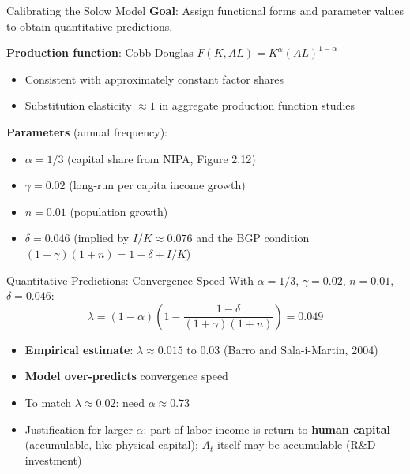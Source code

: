 \documentclass[blue]{beamer}
\begin{document}
\begin{frame}{Calibrating the Solow Model}
	\textbf{Goal}: Assign functional forms and parameter values to obtain quantitative predictions.
	
	\bigskip
	\textbf{Production function}: Cobb-Douglas $F(K,AL) = K^\alpha(AL)^{1-\alpha}$
	\begin{itemize}
		\item Consistent with approximately constant factor shares
		\item Substitution elasticity $\approx 1$ in aggregate production function studies
	\end{itemize}
	
	\bigskip
	\textbf{Parameters} (annual frequency):
	\begin{itemize}
		\item $\alpha = 1/3$ (capital share from NIPA, Figure 2.12)
		\item $\gamma = 0.02$ (long-run per capita income growth)
		\item $n = 0.01$ (population growth)
		\item $\delta = 0.046$ (implied by $I/K \approx 0.076$ and the BGP condition $(1+\gamma)(1+n) = 1 - \delta + I/K$)
	\end{itemize}
\end{frame}

\begin{frame}{Quantitative Predictions: Convergence Speed}
	With $\alpha = 1/3$, $\gamma = 0.02$, $n = 0.01$, $\delta = 0.046$:
	\[
	\lambda = (1-\alpha)\left(1 - \frac{1-\delta}{(1+\gamma)(1+n)}\right) = 0.049
	\]
	
	\begin{itemize}
		\item \textbf{Empirical estimate}: $\lambda \approx 0.015$ to $0.03$ (Barro and Sala-i-Martin, 2004)
		\item \textbf{Model over-predicts} convergence speed
		\item To match $\lambda \approx 0.02$: need $\alpha \approx 0.73$
		\item Justification for larger $\alpha$: part of labor income is return to \textbf{human capital} (accumulable, like physical capital); $A_t$ itself may be accumulable (R\&D investment)
	\end{itemize}
\end{frame}
\end{document}
